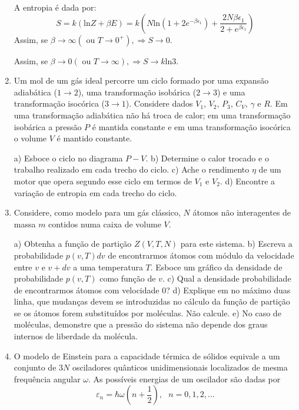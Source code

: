 \begin{enumerate}[start=1,label={\bfseries Q\arabic*.}]
\resposta A entropia é dada por:
$$
S = k(\mathrm{ln}Z + \beta E ) = k \left( N \mathrm{ln} \left( 1 + 2 e^{-\beta \epsilon_{1}}  \right) + \frac{2N\beta \epsilon_{1}}{2+e^{\beta \epsilon_{1}}}  \right)
$$
Assim, se $\beta \rightarrow \infty ( \mbox{ ou } T \rightarrow 0^{+} ), \Rightarrow S \rightarrow 0$.

Assim, se $\beta \rightarrow 0 ( \mbox{ ou } T \rightarrow \infty ), \Rightarrow S \rightarrow k \mathrm{ln} 3$.







\item Um mol de um gás ideal percorre um ciclo formado por uma expansão adiabática ($1 \rightarrow 2$), uma transformação isobárica ($2 \rightarrow 3$) e uma transformação isocórica ($3 \rightarrow 1$). Considere dados $V_{1}$, $V_{2}$, $P_{3}$, $C_{V}$, $\gamma$ e $R$. Em uma transformação adiabática não há troca de calor; em uma transformação isobárica a pressão $P$ é mantida constante e em uma transformação isocórica o volume $V$ é mantido constante.

a) Esboce o ciclo no diagrama $P-V$.
b) Determine o calor trocado e o trabalho realizado em cada trecho do ciclo.
c) Ache o rendimento $\eta$ de um motor que opera segundo esse ciclo em termos de $V_{1}$ e $V_{2}$.
d) Encontre a variação de entropia em cada trecho do ciclo.





\item Considere, como modelo para um gás clássico, $N$ átomos não interagentes de massa $m$ contidos numa caixa de volume $V$.

  a) Obtenha a função de partição $Z(V,T,N)$ para este sistema.
  b) Escreva a probabilidade $p(v,T)dv$ de encontrarmos átomos com módulo da velocidade entre $v$ e $v+dv$ a uma temperatura $T$. Esboce um gráfico da densidade de probabilidade $p(v,T)$ como função de $v$.
  c) Qual a densidade probabilidade de encontrarmos átomos com velocidade 0?
  d) Explique em no máximo duas linha, que mudanças devem se introduzidas no cálculo da função de partição se os átomos forem substituídos por moléculas. Não calcule.
  e) No caso de moléculas, demonstre que a pressão do sistema não depende dos graus internos de liberdade da molécula.





\item O modelo de Einstein para a capacidade térmica de sólidos equivale a um conjunto de $3N$ osciladores quânticos unidimensionais localizados de mesma frequência angular $\omega$. As possíveis energias de um oscilador são dadas por
$$
\varepsilon_{n} = \hbar \omega \left( n + \frac{1}{2}  \right), \  \  \ n = 0,1,2,...
$$


\end{enumerate}

